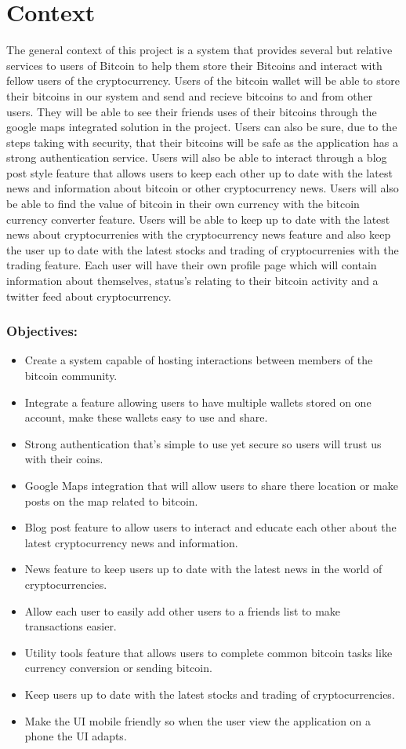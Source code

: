 \chapter{Context}
The general context of this project is a system that provides several but relative services to users of Bitcoin to help them store their Bitcoins and interact with fellow users of the cryptocurrency. Users of the bitcoin wallet will be able to store their bitcoins in our system and send and recieve bitcoins to and from other users. They will be able to see their friends uses of their bitcoins through the google maps integrated solution in the project. Users can also be sure, due to the steps taking with security, that their bitcoins will be safe as the application has a strong authentication service. Users will also be able to interact through a blog post style feature that allows users to keep each other up to date with the latest news and information about bitcoin or other cryptocurrency news. Users will also be able to find the value of bitcoin in their own currency with the bitcoin currency converter feature. Users will be able to keep up to date with the latest news about cryptocurrenies with the cryptocurrency news feature and also keep the user up to date with the latest stocks and trading of cryptocurrenies with the trading feature. Each user will have their own profile page which will contain information about themselves, status's relating to their bitcoin activity and a twitter feed about cryptocurrency.


\subsection{Objectives:}
\begin{itemize}
  \item Create a system capable of hosting interactions between members of the bitcoin community.
  \item Integrate a feature allowing users to have multiple wallets stored on one account, make these wallets easy to use and share.
  \item Strong authentication that’s simple to use yet secure so users will trust us with their coins.
  \item Google Maps integration that will allow users to share there location or make posts on the map related to bitcoin.
  \item Blog post feature to allow users to interact and educate each other about the latest cryptocurrency news and information.
  \item News feature to keep users up to date with the latest news in the world of cryptocurrencies.
  \item Allow each user to easily add other users to a friends list to make transactions easier.
  \item Utility tools feature that allows users to complete common bitcoin tasks like currency conversion or sending bitcoin.
  \item Keep users up to date with the latest stocks and trading of cryptocurrencies.
  \item Make the UI mobile friendly so when the user view the application on a phone the UI adapts.
\end{itemize}

